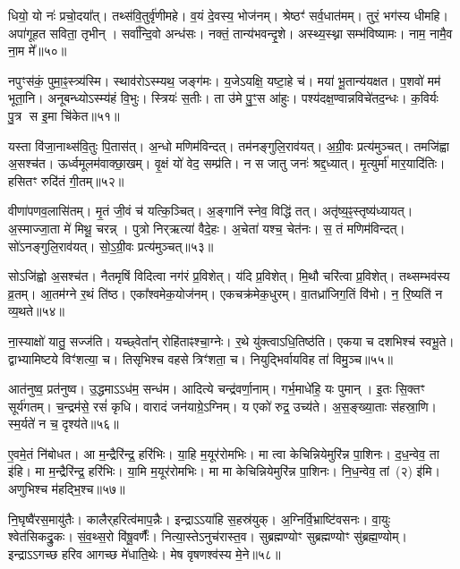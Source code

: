 धियो॒ यो नः॑ प्रचो॒दया᳚त्। तथ्स॑वि॒तुर्वृ॑णीमहे। 
व॒यं दे॒वस्य॒ भोज॑नम्। श्रेष्ठꣳ॑ सर्व॒धात॑मम्। 
तुरं॒ भग॑स्य धीमहि। अपा॑गूहत सविता॒ तृभीन्। 
सर्वा᳚न्दि॒वो अन्ध॑सः। नक्तं॒ तान्य॑\-भवन्दृ॒शे। 
अस्थ्य॒स्थ्ना सम्भ॑विष्यामः। नाम॒ नामै॒व ना॒म मे᳚॥५०॥


नपुꣳस॑कं॒ पुमा॒ꣴ॒स्त्र्य॑स्मि। स्थाव॑रोऽस्म्यथ॒ जङ्ग॑मः। 
य॒जेऽयक्षि॒ यष्टा॒हे च॑। मया॑ भू॒तान्य॑यक्षत। 
प॒शवो॑ मम॑ भूता॒नि। अनूबन्ध्योऽस्म्य॑हं वि॒भुः। 
स्त्रियः॑ स॒तीः। ता उ॑मे पु॒ꣳ॒स आ॑हुः। 
पश्य॑दक्ष॒ण्वान्नविचे॑तद॒न्धः। क॒विर्यः पु॒त्र स इ॒मा चि॑केत॥५१॥


यस्ता वि॑जा॒नाथ्स॑वि॒तुः पि॒तास॑त्। अ॒न्धो मणिम॑विन्दत्। 
तम॑नङ्गुलि॒राव॑यत्। अ॒ग्री॒वः प्रत्य॑मुञ्चत्। 
तमजि॑ह्वा अ॒सश्च॑त। ऊर्ध्वमूलम॑वाक्छा॒खम्। 
वृ॒क्षं यो॑ वेद॒ सम्प्र॑ति। न स जातु जनः॑ श्रद्द॒ध्यात्। 
मृ॒त्युर्मा॑ मार॒यादि॑तिः। हसितꣳ रुदि॑तं गी॒तम्॥५२॥


वीणा॑पणव॒लासि॑तम्। मृ॒तं जी॒वं च॑ यत्कि॒ञ्चित्। 
अ॒ङ्गानि॑ स्नेव॒ विद्धि॑ तत्। अतृ॑ष्य॒ꣴ॒स्तृष्य॑ध्यायत्। 
अ॒स्माज्जा॒ता मे॑ मिथू॒ चरन्न्। पुत्रो निर्‌ऋत्या॑ वैदे॒हः। 
अ॒चेता॑ यश्च॒ चेत॑नः। स॒ तं मणिम॑विन्दत्। 
सो॑ऽनङ्गुलि॒राव॑यत्। सो॒ऽ॒ग्री॒वः प्रत्य॑मुञ्चत्॥५३॥


सोऽजि॑ह्वो अ॒सश्च॑त। नैतमृषिं विदित्वा नग॑रं प्र॒विशेत्। 
य॑दि प्र॒विशेत्। मि॒थौ चरि॑त्वा प्र॒विशेत्। 
तथ्सम्भव॑स्य व्र॒तम्। आ॒तम॑ग्ने र॒थं ति॑ष्ठ। 
एका᳚श्वमेक॒योज॑नम्। एकचक्र॑मेक॒धुरम्। 
वा॒तध्रा॑जिग॒तिं वि॑भो। न॒ रि॒ष्यति॑ न व्य॒थते॥५४॥


ना॒स्याक्षो॑ यातु॒ सज्ज॑ति। यच्छ्वेता᳚न्‌ रोहि॑ताꣴश्चा॒ग्नेः। 
र॒थे यु॑क्त्वा\-ऽ\-धि॒\-तिष्ठ॑ति। एकया च दशभिश्च॑ स्वभू॒ते। 
द्वाभ्यामिष्टये विꣳ॑शत्या॒ च। तिसृभिश्च वहसे त्रिꣳ॑शता॒ च। 
नियुद्भिर्वायविह ता॑ विमु॒ञ्च॥५५॥\anuvakamend


आत॑नुष्व॒ प्रत॑नुष्व। उ॒द्धमाऽऽध॑म॒ सन्ध॑म। 
आदित्ये चन्द्र॑वर्णा॒नाम्। गर्भ॒माधे॑हि॒ यः पुमान्। 
इ॒तः सि॒क्तꣳ सूर्य॑गतम्। च॒न्द्रम॑से॒ रसं॑ कृधि। 
वारादं जन॑याग्रे॒ऽग्निम्। य एको॑ रुद्र॒ उच्य॑ते। 
अ॒स॒ङ्ख्या॒ताः स॑हस्रा॒णि। स्म॒र्यते॑ न च॒ दृश्य॑ते॥५६॥


ए॒वमे॒तं नि॑बोधत। आ म॒न्द्रैरि॑न्द्र॒ हरि॑भिः। 
या॒हि म॒यूर॑रोमभिः। मा त्वा केचिन्नियेमुरि॑न्न पा॒शिनः। 
द॒ध॒न्वेव॒ ता इ॑हि। मा म॒न्द्रैरि॑न्द्र॒ हरि॑भिः। 
या॒मि म॒यूर॑रोमभिः। मा मा केचिन्नियेमुरि॑न्न पा॒शिनः। 
नि॒ध॒न्वेव॒ \mbox{तां (२)} इ॑मि। अणुभिश्च म॑हद्भि॒श्च॥५७॥


नि॒घृष्वै॑रस॒मायु॑तैः। कालैर्‌हरित्व॑माप॒न्नैः। 
इन्द्राऽऽया॑हि स॒हस्र॑\-युक्। अ॒ग्निर्वि॒भ्राष्टि॑वसनः। 
वा॒युः श्वेत॑सिकद्रु॒कः। सं॒व॒थ्स॒रो वि॑षू॒\-वर्णैः᳚। 
नित्या॒स्तेऽ\-नु\-च॑रास्त॒व। सुब्रह्मण्योꣳ सुब्रह्मण्योꣳ सु॑ब्रह्म॒ण्योम्। 
इन्द्राऽऽगच्छ हरिव आगच्छ मे॑धाति॒थेः। मेष वृषणश्व॑स्य मे॒ने॥५८॥


